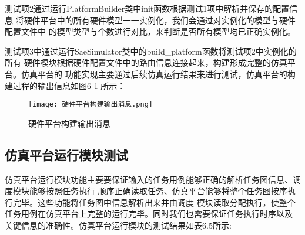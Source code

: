 测试项2通过运行PlatformBuilder类中init函数根据测试1项中解析并保存的配置信息
将硬件平台中的所有硬件模型一一实例化，我们会通过对实例化的模型与硬件配置文件中
的模型类型与个数进行对比，来判断是否所有模型均已正确实例化。

测试项3中通过运行SaeSimulator类中的build\_platform函数将测试项2中实例化的所有
硬件模块根据硬件配置文件中的路由信息连接起来，构建形成完整的仿真平台。仿真平台的
功能实现主要通过后续仿真运行结果来进行测试，仿真平台的构建过程的输出信息如图6-1
所示：

\begin{figure}
    \centering
    \texttt{[image: 硬件平台构建输出消息.png]}
    \caption{硬件平台构建输出消息}
    \label{fig:badge}
\end{figure}

\subsection{仿真平台运行模块测试}

仿真平台运行模块功能主要要保证输入的任务用例能够正确的解析任务图信息、调度模块能够按照任务执行
顺序正确读取任务、仿真平台能够将整个任务图按序执行完毕。这些功能将任务图中信息解析出来并由调度
模块读取分配执行，使整个任务用例在仿真平台上完整的运行完毕。同时我们也需要保证任务执行时序以及
关键信息的准确性。仿真平台运行模块的测试结果如表6.5所示:

